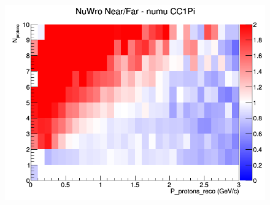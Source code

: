 \begin{figure}[h]
\endminipage
{}
\includegraphics[width=\linewidth]{eff_N_P/GAr/protons/ratios/CC1Pi_NuWro_numu_NF_N_P.png}
\endminipage
\newline
\end{figure}
\clearpage
